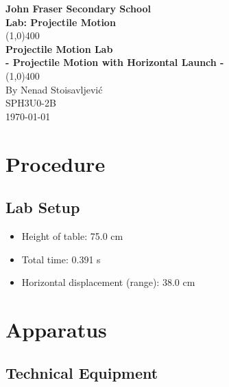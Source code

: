 \documentclass[12pt]{article}
\numberwithin{equation}{section}
\begin{document}
\begin{titlepage}
\begin{center}
\vspace*{1cm}
\Large{\textbf{John Fraser Secondary School}}\\
\Large{\textbf{Lab: Projectile Motion}}\\
\vfill
\line(1,0){400}\\[1mm]
\huge{\textbf{Projectile Motion Lab}}\\[3mm]
\Large{\textbf{- Projectile Motion with Horizontal Launch -}}\\[1mm]
\line(1,0){400}\\
\vfill
By Nenad Stoisavljević\\
SPH3U0-2B\\
\today\\
\end{center}
\end{titlepage}

\tableofcontents
\thispagestyle{empty}
\clearpage

\setcounter{page}{1}

\section{Procedure}

\subsection{Lab Setup}

\begin{itemize}
	\item Height of table: 75.0 cm
	\item Total time: 0.391 s
	\item Horizontal displacement (range): 38.0 cm
\end{itemize}

\section{Apparatus}

\subsection{Technical Equipment}
\end{document}
